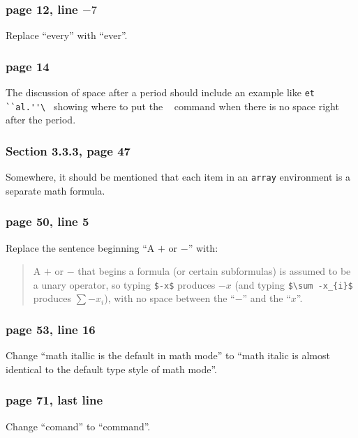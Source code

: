 \subsubsection*{page 12, line $-7$}
Replace ``every'' with ``ever''.
 
\subsubsection*{page 14}
{\sloppy
The discussion of space after a period should include an example
like \verb*|et ``al.''\ | showing where to put the \verb*| | command
when there is no space right after the period.\par}
 
\subsubsection*{Section 3.3.3, page 47}
Somewhere, it should be mentioned that each item in an {\tt array}
environment is a separate math formula.
 
 
\subsubsection*{page 50, line 5}
Replace the sentence beginning ``A $+$ or $-$'' with:
\begin{quotation}
A $+$ or $-$ that begins a formula (or certain subformulas) is assumed
to be a unary operator, so typing \verb|$-x$| produces $-x$ (and typing
\verb|$\sum -x_{i}$| produces $\sum -x_{i}$), with no space between the
``$-$'' and the ``$x$''.
\end{quotation}
 
\subsubsection*{page 53, line 16}
Change ``math itallic is the default in math mode'' to ``math italic is
almost identical to the default type style of math mode''.
 
\subsubsection*{page 71, last line}
Change ``comand'' to ``command''.
 
